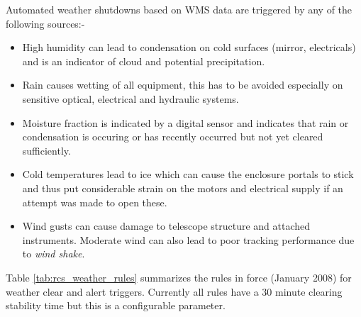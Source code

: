 Automated weather shutdowns based on WMS data are triggered by any of the following sources:-
\begin{itemize}
\item High humidity can lead to condensation on cold surfaces (mirror, electricals) and is an indicator of cloud and potential precipitation.
\item Rain causes wetting of all equipment, this has to be avoided especially on sensitive optical, electrical and hydraulic systems.
\item Moisture fraction is indicated by a digital sensor and indicates that rain or condensation is occuring or has recently occurred but not yet cleared sufficiently.
\item Cold temperatures lead to ice which can cause the enclosure portals to stick and thus put considerable strain on the motors and electrical supply if an attempt was made to open these.
\item Wind gusts  can cause damage to telescope structure and attached instruments. Moderate wind can also lead to poor tracking performance due to \emph{wind shake}.
\end{itemize}

Table \ref{tab:rcs_weather_rules} summarizes the rules in force (January 2008) for weather clear and alert triggers. Currently all rules have a 30 minute clearing stability time but this is a configurable parameter.

